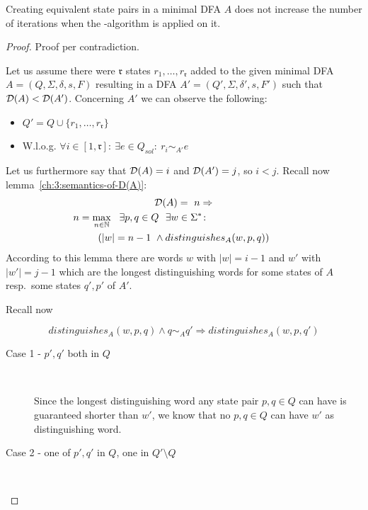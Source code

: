 \begin{theorem}[]
	Creating equivalent state pairs in a minimal DFA $A$ does not increase the number of iterations when the \CompDist-algorithm is applied on it.
\end{theorem}

\begin{proof}
	Proof per contradiction.
	
	\noindent Let us assume there were $\mathfrak{r}$ states $r_1, \ldots, r_\mathfrak{r}$ added to the given minimal DFA $A = (Q, \Sigma, \delta, s, F)$ resulting in a DFA $A' = (Q', \Sigma, \delta', s, F')$ such that $\mathcal{D}(A) < \mathcal{D}(A')$. Concerning $A'$ we can observe the following:
	\begin{itemize}
		\item $Q' = Q \cup \{ r_1, \ldots, r_\mathfrak{r} \}$
		\item W.l.o.g. $\forall i \in [1,\mathfrak{r}] \colon\ \exists e \in Q_{sol}\colon\ r_i \sim_{A'} e$
	\end{itemize}
	Let us furthermore say that $\mathcal{D}(A) = i$ and $\mathcal{D}(A') = j$, so $i < j$. Recall now lemma~\ref{ch:3:semantics-of-D(A)}:
	\begin{multline*}
        \mmD(A) =\ n \Rightarrow \\
        n = \max_{n \in \mathbb{N}}\ \ \exists p, q \in Q\ \ \exists w \in \Sigma^* \colon \hspace{3cm} \\
        (|w| = n - 1\ \land distinguishes_A(w, p, q))
    \end{multline*}
	According to this lemma there are words $w$ with $|w| = i - 1$ and $w'$ with $|w'| = j - 1$ which are the longest distinguishing words for some states of $A$ resp.\ some states $q',p'$ of $A'$.
    
    Recall now
    \begin{lemma}\label{ch:3:lem:disting-trans}
        \[
        distinguishes_A(w, p, q) \land q \sim_A q' \Rightarrow distinguishes_A(w, p, q')
        \]
    \end{lemma}
    \begin{description}
        \item[Case 1 - $p',q'$ both in $Q$] $ $
        
        Since the longest distinguishing word any state pair $p,q \in Q$ can have is guaranteed shorter than $w'$, we know that no $p,q \in Q$ can have $w'$ as distinguishing word. \hfill\lightning
        
        \item[Case 2 - one of $p',q'$ in $Q$, one in $Q'\setminus Q$] $ $
        

\end{description}
\end{proof}
